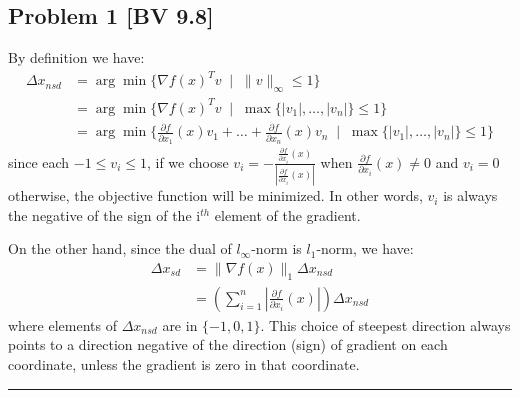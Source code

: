 \documentclass[12pt, letterpaper, twoside]{article}
\begin{document}
\subsection*{Problem 1 \small[BV 9.8]}
By definition we have:
\begin{align*}
    \Delta x_{nsd} &= \arg\min\{\nabla f(x)^Tv\;\;|\;\;\|v\|_\infty\leq1\}\\
    &=\arg\min\{\nabla f(x)^Tv\;\;|\;\;\max\{|v_1|,\dots,|v_n|\}\leq1\}\\
    &=\arg\min\{\frac{\partial f}{\partial x_1}(x)v_1+\dots+\frac{\partial f}{\partial x_n}(x)v_n \;\;|\;\;\max\{|v_1|,\dots,|v_n|\}\leq1\}
\end{align*}
since each $-1\leq v_i \leq 1$, if we choose $v_i=-\frac{\frac{\partial f}{\partial x_i}(x)}{|\frac{\partial f}{\partial x_i}(x)|}$ when $\frac{\partial f}{\partial x_i}(x)\neq0$ and $v_i=0$ otherwise, the objective function will be minimized. In other words, $v_i$ is always the negative of the sign of the i$^{th}$ element of the gradient.

On the other hand, since the dual of $l_\infty$-norm is $l_1$-norm, we have:
\begin{align*}
    \Delta x_{sd} &= \|\nabla f(x)\|_1 \Delta x_{nsd}\\
    &= \left(\sum_{i=1}^n|\frac{\partial f}{\partial x_i}(x)|\right)\Delta x_{nsd}
\end{align*}
where elements of $\Delta x_{nsd}$ are in $\{-1, 0, 1\}$. This choice of steepest direction always points to a direction negative of the direction (sign) of gradient on each coordinate, unless the gradient is zero in that coordinate.\\
\hrule
\end{document}
